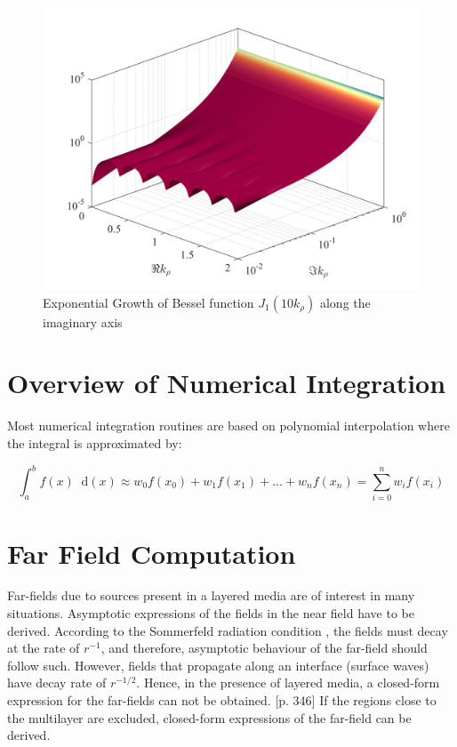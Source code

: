 \documentclass[11pt]{article}
\newcommand{\p}{\rho}  %
\renewcommand{\^}{\hat}  %
\newcommand*\diff{\mathop{}\!\mathrm{d}} %
\begin{document}
\begin{figure}[h!]
  \centering
  \includegraphics[width=\textwidth]{figures/J_1_comp.png}
  \caption{Exponential Growth of Bessel function $J_1(10 k_{\p})$ along the imaginary axis}
  \label{fig:bessel}
\end{figure}

\section{Overview of Numerical Integration}

Most numerical integration routines are based on polynomial interpolation where the integral is approximated by:

\begin{equation}
  \int_a^b f(x) \diff(x) \approx w_0 f(x_0) + w_1 f(x_1) + ... + w_n f(x_n) = \sum_{i = 0}^n w_i f(x_i)
  \label{eq:Num_int}
\end{equation}

\section{Far Field Computation}

Far-fields due to sources present in a layered media are of interest in many situations. Asymptotic expressions of the fields in the near field have to be derived. According to the Sommerfeld radiation condition \cite[p. 189]{sommerfeld1949partial}, the fields must decay at the rate of $r^{-1}$, and therefore,  asymptotic behaviour of the far-field should follow such. However, fields that propagate along an interface (surface waves) have decay rate of $r^{-1/2}$. Hence, in the presence of layered media, a closed-form expression for the far-fields can not be obtained. \cite[p. 346]{novotny2006principles}[p. 346] If the regions close to the multilayer are excluded, closed-form expressions of the far-field can be derived. \cite[p. 1183]{michalski2005electromagnetic}


  \clearpage %
  
  
\end{document}

